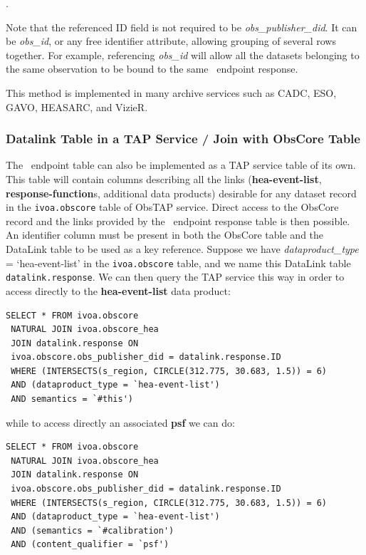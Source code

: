 .

\noindent Note that the referenced ID field is not required to be  {\em obs\_publisher\_did\/}. It can be  {\em obs\_id\/}, or any free identifier attribute, allowing grouping of several rows together. For example, referencing {\em obs\_id\/} will allow all the datasets belonging to the same observation to be bound to the same \blinks\ endpoint response.
      	
This method is implemented in many archive services such as CADC, ESO, GAVO, HEASARC, and VizieR.    
	
 \subsubsection{Datalink Table in a TAP  Service / Join with ObsCore Table}
 \label{sec:datalinktap}

The \blinks\ endpoint table can also be implemented as a TAP service table of its own. This table will contain  columns describing  all the links ({\bf hea-event-list}, {\bf response-function}s, additional data products) desirable for any dataset record in the {\tt ivoa.obscore} table of ObsTAP service.
Direct access to the ObsCore record and the links provided by the \blinks\ endpoint response table is then possible. An identifier column must be present in both the ObsCore table and the DataLink table to be used as a key reference. Suppose we have  {\em dataproduct\_type} = `hea-event-list' in the {\tt ivoa.obscore} table, and we name this DataLink table {\tt datalink.response}\null. We can then query the TAP service this way in order to access directly to the {\bf hea-event-list} data product:

\smallskip
{\small
\begin{verbatim}
SELECT * FROM ivoa.obscore
 NATURAL JOIN ivoa.obscore_hea
 JOIN datalink.response ON
 ivoa.obscore.obs_publisher_did = datalink.response.ID
 WHERE (INTERSECTS(s_region, CIRCLE(312.775, 30.683, 1.5)) = 6)
 AND (dataproduct_type = `hea-event-list')
 AND semantics = `#this')
\end{verbatim}
}

\noindent while to access directly an associated {\bf psf} we can do:

{\small
\begin{verbatim}
SELECT * FROM ivoa.obscore
 NATURAL JOIN ivoa.obscore_hea
 JOIN datalink.response ON 
 ivoa.obscore.obs_publisher_did = datalink.response.ID
 WHERE (INTERSECTS(s_region, CIRCLE(312.775, 30.683, 1.5)) = 6)
 AND (dataproduct_type = `hea-event-list')
 AND (semantics = `#calibration')
 AND (content_qualifier = `psf')
\end{verbatim}
}

